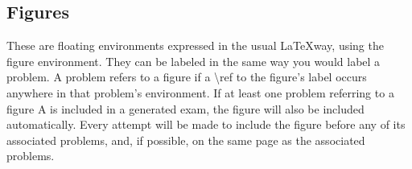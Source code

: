 \documentclass{article}
\begin{document}
\subsection{Figures}
These are floating environments expressed in the usual \LaTeX way, using the figure environment. They can be labeled in the same way you would label a problem. A problem refers to a figure if a \textbackslash{ref} to the figure's label occurs anywhere in that problem's environment. If at least one problem referring to a figure A is included in a generated exam, the figure will also be included automatically. Every attempt will be made to include the figure before any of its associated problems, and, if possible, on the same page as the associated problems.


\end{document}
